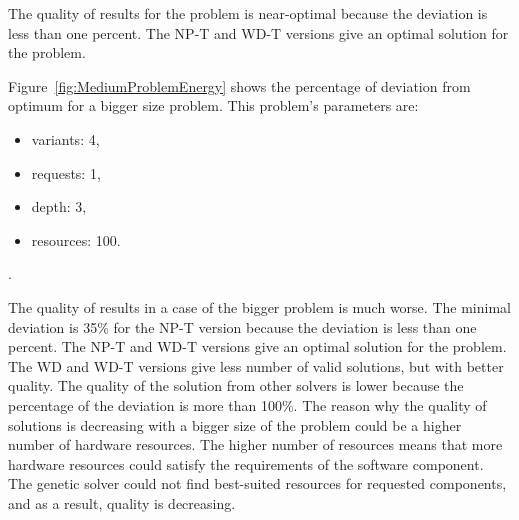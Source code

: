 The quality of results for the problem is near-optimal because the deviation is less than one percent. The NP-T and WD-T versions give an optimal solution for the problem.

Figure~\ref{fig:MediumProblemEnergy} shows the percentage of deviation from optimum for a bigger size problem. This problem's parameters are:
\begin{itemize}
	\item variants: 4,
	\item requests: 1,
	\item depth: 3,
	\item resources: 100.
\end{itemize}.

The quality of results in a case of the bigger problem is much worse. The minimal deviation is 35\% for the NP-T version because the deviation is less than one percent. The NP-T and WD-T versions give an optimal solution for the problem. The WD and WD-T versions give less number of valid solutions, but with better quality. The quality of the solution from other solvers is lower because the percentage of the deviation is more than 100\%. The reason why the quality of solutions is decreasing with a bigger size of the problem could be a higher number of hardware resources. The higher number of resources means that more hardware resources could satisfy the requirements of the software component. The genetic solver could not find best-suited resources for requested components, and as a result, quality is decreasing. 


